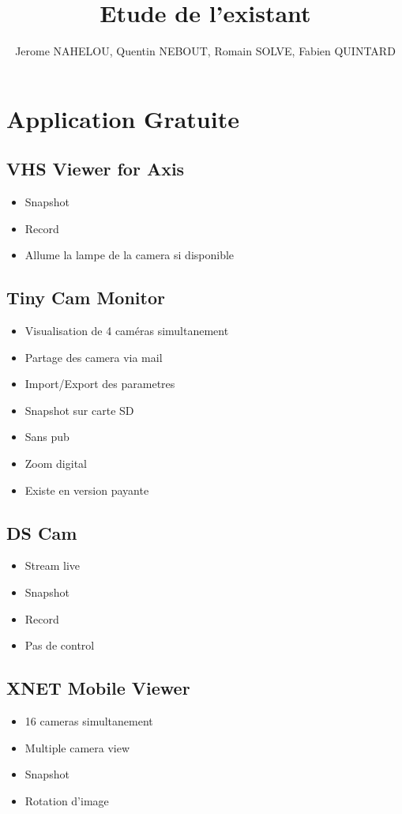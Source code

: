 \documentclass[a4paper,10pt]{report}
\begin{document}
\title{Etude de l'existant}
\author{Jerome NAHELOU, Quentin NEBOUT, Romain SOLVE, Fabien QUINTARD}

\chapter{Application Gratuite}
\section{VHS Viewer for Axis}
\begin{itemize}
  \item Snapshot
  \item Record
  \item Allume la lampe de la camera si disponible
\end{itemize}

\section{Tiny Cam Monitor}
\begin{itemize}
  \item Visualisation de 4 caméras simultanement
  \item Partage des camera via mail
  \item Import/Export des parametres
  \item Snapshot sur carte SD
  \item Sans pub
  \item Zoom digital
  \item Existe en version payante
\end{itemize}

\section{DS Cam}
\begin{itemize}
  \item Stream live
  \item Snapshot
  \item Record
  \item Pas de control
\end{itemize}

\section{XNET Mobile Viewer}
\begin{itemize}
  \item 16 cameras simultanement
  \item Multiple camera view
  \item Snapshot
  \item Rotation d'image
\end{itemize}
\end{document}
